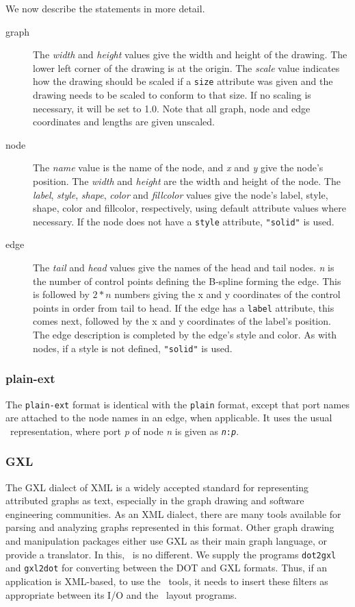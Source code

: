 We now describe the statements in more detail.
\begin{description}
\item[graph] 
The {\em width} and {\em height} values give the 
width and height of the drawing. The 
lower left corner of the drawing is at the origin. 
The {\em scale} value indicates 
how the drawing should be scaled if a {\tt size} attribute was given and the 
drawing needs to be scaled to conform to that size. If no scaling is 
necessary, it will be set to 1.0. Note that all graph, node and edge 
coordinates and lengths are given unscaled. 
\item[node] 
The {\em name} value is the name of the node, and 
{\em x} and {\em y} give the node's position. 
The {\em width} and {\em height} are the width and height of the node. 
The {\em label}, {\em style},
{\em shape}, {\em color} and {\em fillcolor} values 
give the node's label, style, shape, color and 
fillcolor, respectively, using default attribute values where necessary. 
If the node does not have a {\tt style} attribute, {\tt "solid"} is used. 
\item[edge] 
The {\em tail} and {\em head} values give the names of the head and tail nodes. 
{\em n} is the number of control points defining the B-spline forming the edge.
This is followed by $2*n$ numbers giving the x and y coordinates of the 
control points in order from tail to head. If the edge has a {\tt label}
attribute, 
this comes next, followed by the x and y coordinates of the label's position. 
The edge description is completed by the edge's style and color. As with 
nodes, if a style is not defined, {\tt "solid"} is used. 
\end{description}

\subsubsection{plain-ext}
The {\tt plain-ext} format is identical with the {\tt plain} format,
except that port names are attached to the node names in an edge,
when applicable. It uses the usual \DOT\ representation, where port
{\em p} of node {\em n} is given as {\tt {\em n}:{\em p}}.

\subsubsection{GXL}
The GXL \cite{gxl} dialect of XML is a widely accepted standard for
representing attributed graphs as text, especially in the graph
drawing and software engineering communities. As an XML dialect, there
are many tools available for parsing and analyzing graphs represented
in this format. Other graph drawing and manipulation packages either 
use GXL as their main graph language, or provide a translator.  
In this, \gviz\ is no different. We supply the programs
{\tt dot2gxl} and {\tt gxl2dot} for converting between the DOT and
GXL formats. Thus, if an application is XML-based, to use the
\gviz\ tools, it needs to insert these filters as appropriate between
its I/O and the \gviz\ layout programs.  

